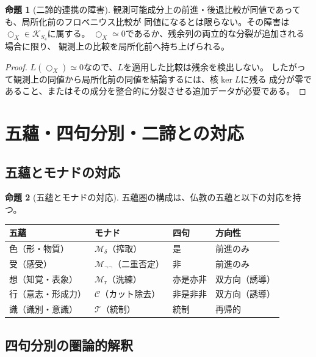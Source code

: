 \documentclass[11pt,a4paper]{ltjsarticle}
\theoremstyle{definition}
\newtheorem{proposition}{命題}[section]
\newcommand{\Mdelta}{\mathcal{M}_{\delta}}
\newcommand{\Mneg}{\mathcal{M}_{\neg\neg}}
\newcommand{\Mr}{\mathcal{M}_{\mathrm{r}}}
\newcommand{\Mc}{\mathcal{C}}
\newcommand{\T}{\mathcal{T}}
\newcommand{\KSfour}{\mathcal{K}_{S_4}}
\begin{document}
\begin{proposition}[二諦的連携の障害]
観測可能成分上の前進・後退比較が同値であっても、局所化前のフロベニウス比較が
同値になるとは限らない。その障害は$\bigcirc_X\in\KSfour$に属する。
$\bigcirc_X\simeq0$であるか、残余列の両立的な分裂が追加される場合に限り、
観測上の比較を局所化前へ持ち上げられる。
\end{proposition}
\begin{proof}
$L(\bigcirc_X)\simeq0$なので、$L$を適用した比較は残余を検出しない。
したがって観測上の同値から局所化前の同値を結論するには、核$\ker L$に残る
成分が零であること、またはその成分を整合的に分裂させる追加データが必要である。
\end{proof}

\section{五蘊・四句分別・二諦との対応}

\subsection{五蘊とモナドの対応}

\begin{proposition}[五蘊とモナドの対応]
五蘊圏の構成は、仏教の五蘊と以下の対応を持つ。

\begin{center}
\begin{tabular}{llll}
\hline
\textbf{五蘊} & \textbf{モナド} & \textbf{四句} & \textbf{方向性} \\
\hline
色（形・物質） & $\Mdelta$（搾取） & 是 & 前進のみ \\
受（感受） & $\Mneg$（二重否定） & 非 & 前進のみ \\
想（知覚・表象） & $\Mr$（洗練） & 亦是亦非 & 双方向（誘導） \\
行（意志・形成力） & $\Mc$（カット除去） & 非是非非 & 双方向（誘導） \\
識（識別・意識） & $\T$（統制） & 統制 & 再帰的 \\
\hline
\end{tabular}
\end{center}
\end{proposition}

\subsection{四句分別の圏論的解釈}
\end{document}

